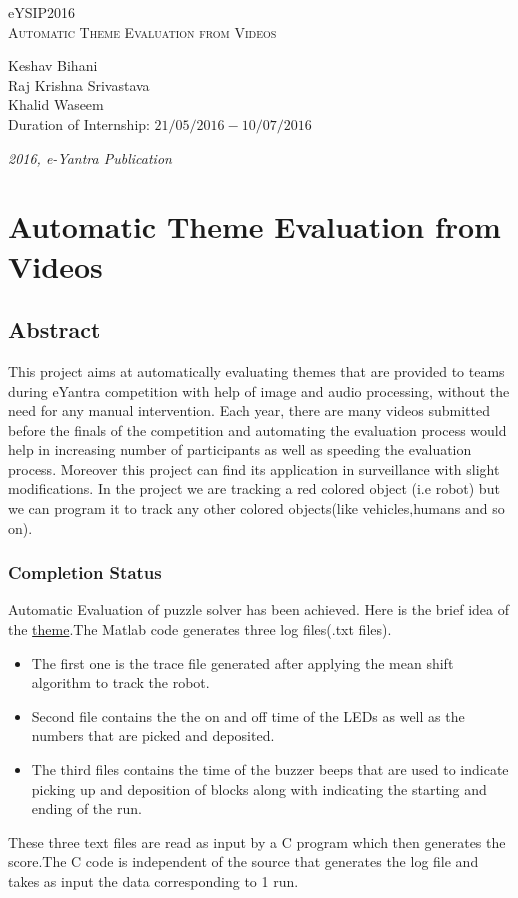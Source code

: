 \documentclass[a4paper,12pt,oneside]{book}
\begin{document}
\begin{titlepage}
\raggedright
{\Large eYSIP2016\\[1cm]}
{\Huge\scshape Automatic Theme Evaluation from Videos \\[.1in]}
\vfill
\begin{flushright}
{\large Keshav Bihani \\}
{\large Raj Krishna Srivastava \\}
{\large Khalid Waseem \\}
{\large Duration of Internship: $ 21/05/2016-10/07/2016 $ \\}
\end{flushright}

{\itshape 2016, e-Yantra Publication}
\end{titlepage}

\chapter[Project Tag]{Automatic Theme Evaluation from Videos}
\section*{Abstract}
This project aims at automatically evaluating themes that are provided to teams during eYantra competition with help of image and audio processing, without the need for any manual intervention.
Each year, there are many videos submitted before the finals of the competition and automating the evaluation process would help in increasing number of participants as well as speeding the evaluation process. Moreover this project can find its application in surveillance with slight modifications. In the project we are tracking a red colored object (i.e robot) but we can program it to track any other colored objects(like vehicles,humans and so on).

\subsection*{Completion Status}
Automatic Evaluation of puzzle solver has been achieved. Here is the brief idea of the \href{https://www.youtube.com/watch?v=didlhJrfUUA}{theme}.The Matlab code generates three log files(.txt files).
\begin{itemize}
  \item The first one is the trace file generated after applying the mean shift algorithm to track the robot.
  \item Second file contains the the on and off time of the LEDs as well as the numbers that are picked and deposited.
  \item The third files contains the time of the buzzer beeps that are used to indicate picking up and deposition of blocks along with indicating the starting and ending of the run.
\end{itemize} 
These three text files are read as input by a C program which then generates the score.The C code is independent of the source that generates the log file and takes as input the data corresponding to 1 run. 
\end{document}
